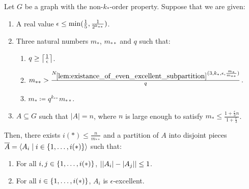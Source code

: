         \begin{lemma} \label{lem:resume_of_all_conditions_for_excellent_partitions}
            Let $G$ be a graph with the non-$k_{*}$-order property.
            Suppose that we are given:
            \begin{enumerate}[label={\Roman*}., ref={\Roman*}, font=\rmfamily]
                \item A real value $\epsilon \leq \min ( \frac{1}{5}, \frac{1}{2^{k_{**}}} )$.
                \item Three natural numbers $m_*$, $m_{**}$ and $q$ such that:
                    \begin{enumerate}[label=\alph*., ref=2.\alph*]
                        \item \label{itm:resume_of_all_conditions_for_excellent_partitions.a} $q \geq \left\lceil \frac{1}{\epsilon} \right\rceil$.
                        \item \label{itm:resume_of_all_conditions_for_excellent_partitions.b}
                            $m_{**} > \frac{N_{\ref{lem:existance_of_even_excellent_subpartition}}
                                ( 3, k_*, \epsilon, \frac{m_*}{m_{**}} )}{q}$.
                        \item \label{itm:resume_of_all_conditions_for_excellent_partitions.c} $m_* \coloneqq q^{k_{**}} m_{**}$.
                \end{enumerate}
                \item \label{itm:resume_of_all_conditions_for_excellent_partitions.3}
                    $A \subseteq G$ such that $|A| = n$, where $n$ is large enough to satisfy
                    $m_* \leq \frac{1 + \frac{\epsilon}{3}n}{1 + \frac{\epsilon}{3}}$.
            \end{enumerate}
            Then, there exists $i(*) \leq \frac{n}{m_{**}}$ and a partition of $A$ into disjoint pieces
            $\overline{A} = \left< A_i \mid i \in \{ 1, \dots, i(*) \} \right>$ such that:
            \begin{enumerate}[label={\roman*}., ref={\roman*}, font=\rmfamily]
                \item \label{itm:resume_of_all_conditions_for_excellent_partitions.i}
                    For all $i, j \in \{ 1, \dots, i(*) \}$, $| | A_i |- | A_j | | \leq 1$.
                \item \label{itm:resume_of_all_conditions_for_excellent_partitions.ii}
                    For all $i \in \{ 1, \dots, i(*) \}$, $A_i$ is $\epsilon$-excellent.

\end{enumerate}
\end{lemma}
